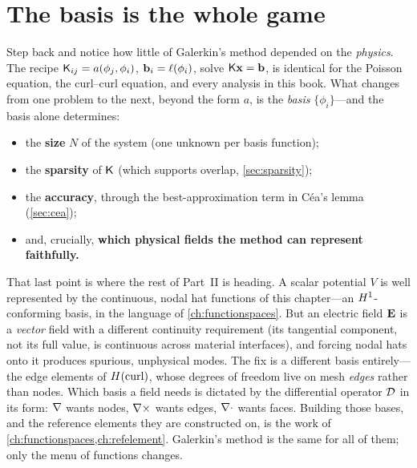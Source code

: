 \section{The basis is the whole game}
\label{sec:basis-is-everything}

Step back and notice how little of Galerkin's method depended on the
\emph{physics}. The recipe $\mathsf{K}_{ij}=a(\phi_j,\phi_i)$, $\mathbf{b}_i=\ell(\phi_i)$,
solve $\mathsf{K}\mathbf{x}=\mathbf{b}$, is identical for the Poisson equation, the curl--curl
equation, and every analysis in this book. What changes from one problem to the
next, beyond the form $a$, is the \emph{basis} $\{\phi_i\}$---and the basis alone
determines:

\begin{itemize}[nosep]
\item the \textbf{size} $N$ of the system (one unknown per basis function);
\item the \textbf{sparsity} of $\mathsf{K}$ (which supports overlap,
\cref{sec:sparsity});
\item the \textbf{accuracy}, through the best-approximation term in Céa's lemma
(\cref{sec:cea});
\item and, crucially, \textbf{which physical fields the method can represent
faithfully.}
\end{itemize}

That last point is where the rest of Part~II is heading. A scalar potential $V$
is well represented by the continuous, nodal hat functions of this chapter---an
$H^1$-conforming basis, in the language of \cref{ch:functionspaces}. But an
electric field $\mathbf{E}$ is a \emph{vector} field with a different continuity
requirement (its tangential component, not its full value, is continuous across
material interfaces), and forcing nodal hats onto it produces spurious,
unphysical modes. The fix is a different basis entirely---the edge elements of
$H(\mathrm{curl})$, whose degrees of freedom live on mesh \emph{edges} rather than nodes.
Which basis a field needs is dictated by the differential operator $\mathcal{D}$ in
its form: $\nabla$ wants nodes, $\nabla\times$ wants edges, $\nabla\cdot$ wants faces. Building
those bases, and the reference elements they are constructed on, is the work of
\cref{ch:functionspaces,ch:refelement}. Galerkin's method is the same for all of
them; only the menu of functions changes.

